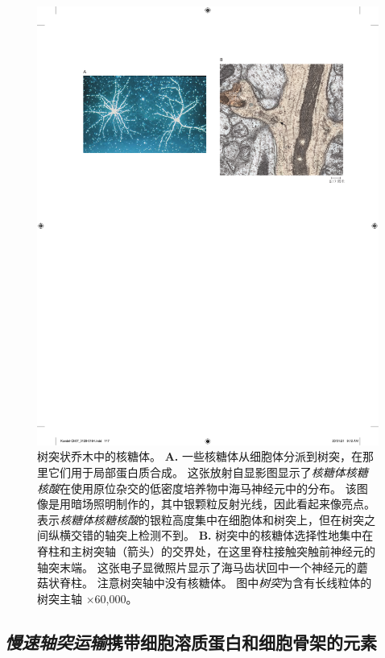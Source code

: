 \begin{figure}[htbp]
	\centering
	\includegraphics[width=1.0\linewidth]{chap07/fig_7_12}
	\caption{树突状乔木中的核糖体。
		\textbf{A.} 一些核糖体从细胞体分派到树突，在那里它们用于局部蛋白质合成。
		这张放射自显影图显示了\textit{核糖体核糖核酸}在使用原位杂交的低密度培养物中海马神经元中的分布。
		该图像是用暗场照明制作的，其中银颗粒反射光线，因此看起来像亮点。
		表示\textit{核糖体核糖核酸}的银粒高度集中在细胞体和树突上，但在树突之间纵横交错的轴突上检测不到。
		\textbf{B.} 树突中的核糖体选择性地集中在脊柱和主树突轴（箭头）的交界处，在这里脊柱接触突触前神经元的轴突末端。
		这张电子显微照片显示了海马齿状回中一个神经元的蘑菇状脊柱。
		注意树突轴中没有核糖体。
		图中\textit{树突}为含有长线粒体的树突主轴 ×60,000。}
	\label{fig:7_12}
\end{figure}


\subsection{\textit{慢速轴突运输}携带细胞溶质蛋白和细胞骨架的元素}

